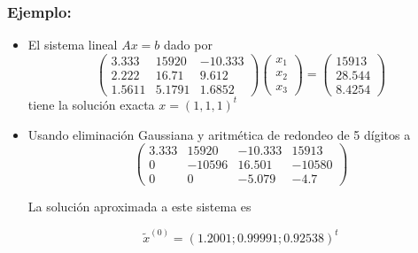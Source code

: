 \documentclass[10pt]{beamer}
\begin{document}
  \begin{frame}
    \frametitle{Ejemplo:}
    \begin{itemize}
      \item<1->El sistema lineal $A x = b$ dado por
      $$
      \left(\begin{array}{ccc}
          3.333 & 15920 & -10.333\\
          2.222 & 16.71 & 9.612\\
          1.5611 & 5.1791 & 1.6852
        \end{array}\right)\left(\begin{array}{c}
        x_1\\
        x_2\\
        x_3
        \end{array}\right)=\left(\begin{array}{c}
        15913\\
        28.544\\
        8.4254
        \end{array}\right)
      $$      
      tiene la soluci\'on exacta $x = (1, 1, 1)^t$
      \item<2-> Usando eliminaci\'on Gaussiana y aritm\'etica de redondeo de 5 d\'igitos a
      $$
      \left(\begin{array}{ccc|c}
             3.333 & 15920 & -10.333 & 15913\\
             0 & -10596 & 16.501 &-10580\\
             0 & 0 & -5.079 & -4.7
            \end{array}\right)
      $$
      
      La soluci\'on aproximada a este sistema es
      
      $$
      \tilde x^{(0)} = (1.2001; 0.99991; 0.92538)^t
      $$
      \end{itemize}
\end{frame}
\end{document}

